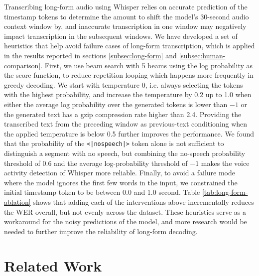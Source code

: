 Transcribing long-form audio using Whisper relies on accurate prediction of the timestamp tokens to determine the amount to shift the model's 30-second audio context window by, and inaccurate transcription in one window may negatively impact transcription in the subsequent windows.
We have developed a set of heuristics that help avoid failure cases of long-form transcription, which is applied in the results reported in sections \ref{subsec:long-form} and \ref{subsec:human-comparison}.
First, we use beam search with 5 beams using the log probability as the score function, to reduce repetition looping which happens more frequently in greedy decoding. We start with temperature 0, i.e. always selecting the tokens with the highest probability, and increase the temperature by 0.2 up to 1.0 when either the average log probability over the generated tokens is lower than $-1$ or the generated text has a gzip compression rate higher than 2.4. Providing the transcribed text from the preceding window as previous-text conditioning when the applied temperature is below 0.5 further improves the performance.
We found that the probability of the \texttt{<|nospeech|>} token alone is not sufficient to distinguish a segment with no speech, but combining the no-speech probability threshold of 0.6 and the average log-probability threshold of $-1$ makes the voice activity detection of Whisper more reliable.
Finally, to avoid a failure mode where the model ignores the first few words in the input, we constrained the initial timestamp token to be between 0.0 and 1.0 second.
Table \ref{tab:long-form-ablation} shows that adding each of the interventions above incrementally reduces the WER overall, but not evenly across the dataset.
These heuristics serve as a workaround for the noisy predictions of the model, and more research would be needed to further improve the reliability of long-form decoding.

\section{Related Work}\label{sec:related}

